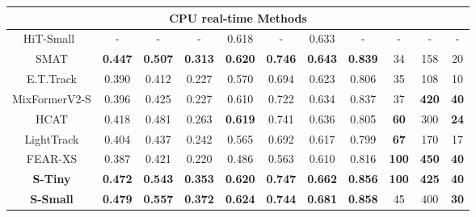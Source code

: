 \begin{table}[th!]
{\begin{tabular}{c |c c  c  |c c  |c c |c c c}
	\hline
	\multicolumn{11}{c}{CPU real-time Methods} \\
	\hline  
	
	HiT-Small~\cite{kang2023exploring} & - & - & - &  0.618 & - & 0.633 & - & - & - & -\\
	SMAT \cite{gopal2024separable} & \color{ForestGreen} \bf{0.447} & \color{ForestGreen} \bf{0.507} & \color{ForestGreen} \bf{0.313}  &  \color{RoyalBlue} \bf{0.620}  &  \color{RoyalBlue} \bf{0.746} & \color{ForestGreen} \bf{0.643}  & \color{ForestGreen} \bf{0.839} & 34 & 158 & 20 \\
	E.T.Track \cite{blatter2023efficient} & 0.390 & 0.412 & 0.227               & 0.570  & 0.694 & 0.623  & 0.806 & 35 & 108 & 10 \\
	MixFormerV2-S \cite{cui2024mixformerv2} & 0.396 & 0.425 & 0.227             & 0.610  & 0.722 & 0.634  & 0.837 & 37 & \color{ForestGreen} \bf{420} & \color{Mahogany} \bf{40} \\
	HCAT \cite{chen2022efficient} & 0.418 & 0.481 & 0.263                       & \color{ForestGreen} \bf{0.619}  & 0.741 & 0.636  & 0.805 & \color{ForestGreen} \bf{60} & 300 & \color{ForestGreen} \bf{24} \\
	LightTrack \cite{yan2021lighttrack} & 0.404 & 0.437 & 0.242                 & 0.565  & 0.692 & 0.617  & 0.799 & \color{RoyalBlue} \bf{67} & 170 & 17 \\
	FEAR-XS \cite{borsuk2022fear} & 0.387 & 0.421 & 0.220                       & 0.486  & 0.563 & 0.610  & 0.816 &  \color{Mahogany} \bf{100} & \color{Mahogany} \bf{450} & \color{Mahogany} \bf{40}\\
  
	
	\rowcolor{lightgray!20} \bf{S-Tiny}  &  \color{RoyalBlue} \bf{0.472} &  \color{RoyalBlue} \bf{0.543} &  \color{RoyalBlue} \bf{0.353}  &  \color{RoyalBlue} \bf{0.620}  &  \color{Mahogany} \bf{0.747} &  \color{RoyalBlue} \bf{0.662} &  \color{RoyalBlue} \bf{0.856} &  \color{Mahogany} \bf{100} & \color{RoyalBlue} \bf{425} & \color{Mahogany} \bf{40}\\
	\rowcolor{lightgray!20} \bf{S-Small} &  \color{Mahogany} \bf{0.479} &  \color{Mahogany} \bf{0.557} &  \color{Mahogany} \bf{0.372}  &  \color{Mahogany} \bf{0.624}  & \color{ForestGreen} \bf{0.744} &  \color{Mahogany} \bf{0.681}  &  \color{Mahogany} \bf{0.858} &  45 & 400 & \color{RoyalBlue} \bf{30}\\
	\hline
	\end{tabular}
	}
  \end{table}

